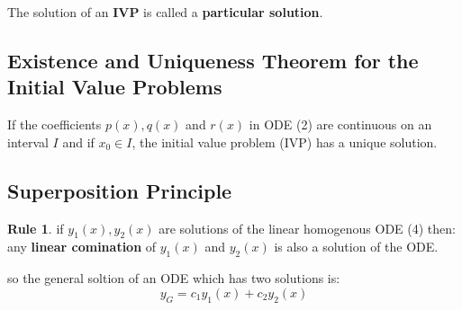 \documentclass[11pt]{article}
\theoremstyle{definition}
\newtheorem{reg}{Rule}
\begin{document}
The solution of an \textbf{IVP} is called a \textbf{particular solution}.
\subsection{Existence and Uniqueness Theorem for the Initial Value Problems}

If the coefficients $p(x), q(x)$ and $r(x)$ in ODE (2) are continuous
on an interval $I$ and if $x_0\in I$, the initial value problem (IVP) has a unique solution.

\subsection{Superposition Principle}
\begin{reg}if $y_1(x), y_2(x)$ are solutions of the linear homogenous ODE (4) then: any \textbf{linear comination} of  $y_1(x)$ and $y_2(x)$ is also a solution of the ODE.
\end{reg}
so the general soltion of an ODE which has two solutions is:
\begin{equation}
    y_G = c_1 y_1(x)+c_2 y_2(x) 
\end{equation}
\end{document}

